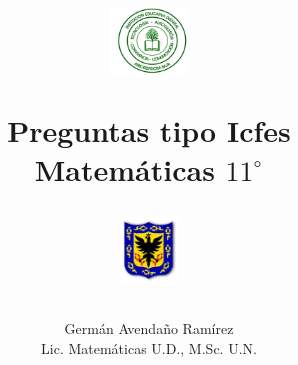 \documentclass[10pt,letterpaper,addpoints]{exam}
\begin{document}
\title{\begin{minipage}{.2\textwidth}
        \includegraphics[height=1.75cm]{Images/logo-colegio.png}
       \end{minipage}
\begin{minipage}{.55\textwidth}
 \begin{center}
Preguntas tipo Icfes \\Matemáticas $11^{\circ}$
\end{center}
\end{minipage}
\begin{minipage}{.2\textwidth}
\includegraphics[height=1.75cm]{Images/logo-sed.png} 
\end{minipage}
}
\author{Germ\'{a}n Avendaño Ram\'{i}rez\\Lic. Matemáticas U.D., M.Sc. U.N.}
\date{}
\maketitle
\vspace{0.1in}
\end{document}
